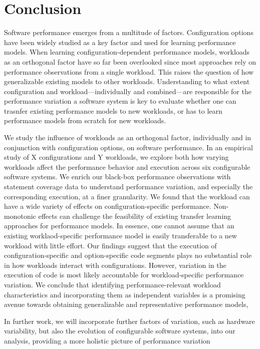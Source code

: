 {\color{blue!50!black}
\section{Conclusion}
Software performance emerges from a multitude of factors. Configuration options have been widely studied as a key factor and used for learning performance models.  When learning configuration-dependent performance models, workloads as an orthogonal factor have so far been overlooked since most approaches rely on performance observations from a single workload. This raises the question of how generalizable existing models to other workloads. 
Understanding to what extent configuration and workload---individually and combined---are responsible for the performance variation a software system is key to evaluate whether one can trasnfer existing performance models to new workloads, or has to learn performance models from scratch for new workloads.

We study the influence of workloads as an orthogonal factor, individually and in conjunction with configuration options, on software performance. In an empirical study of X configurations and Y workloads, we explore both how varying workloads affect the performance behavior and execution across six configurable software systems. We enrich our black-box performance observations with statement coverage data to understand performance variation, and especially the corresponding execution, at a finer granularity.
We found that the workload can have a wide variety of effects on configuration-specific performance. Non-monotonic effects can challenge the feasibility of existing transfer learning approaches for performance models. In essence, one cannot assume that an existing  worklaod-specific performance model is easily transferable to a new workload with little effort.
Our findings suggest that the execution of configuration-specific and option-specific code segments plays no substantial role in how workloads interact with configurations. However, variation in the execution of code is most likely accountable for workload-specific performance variation. We conclude that identifying performance-relevant workload characteristics and incorporating them as independent variables is a promising avenue towards obtaining generalizable and representative performance models, 

In further work, we will incorporate further factors of variation, such as hardware variability, but also the evolution of configurable software systems, into our analysis, providing a more holistic picture of performance variation%
}